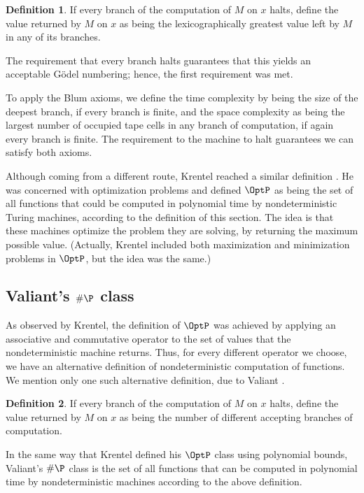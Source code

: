 \documentclass[12pt]{article}
\theoremstyle{definition}
\newtheorem{definition}{Definition}
\begin{document}
\begin{definition}
    If every branch of the computation of $M$ on $x$ halts,
    define the value returned by $M$ on $x$
    as being the lexicographically greatest value
    left by $M$ in any of its branches.
\end{definition}

The requirement that every branch halts
guarantees that this yields an acceptable Gödel numbering;
hence, the first requirement was met.

To apply the Blum axioms,
we define the time complexity by being the size of the deepest branch,
if every branch is finite,
and the space complexity as being the largest number of occupied tape cells
in any branch of computation,
if again every branch is finite.
The requirement to the machine to halt
guarantees we can satisfy both axioms.

Although coming from a different route,
Krentel reached a similar definition \cite{Krentel1988}.
He was concerned with optimization problems
and defined $\OptP$ as being the set of all functions
that could be computed in polynomial time
by nondeterministic Turing machines,
according to the definition of this section.
The idea is that these machines optimize the problem they are solving,
by returning the maximum possible value.
(Actually, Krentel included both maximization and minimization problems
in $\OptP$, but the idea was the same.)

\subsection{Valiant's $\#\P$ class}

As observed by Krentel,
the definition of $\OptP$ was achieved by applying
an associative and commutative operator to the set of values
that the nondeterministic machine returns.
Thus,
for every different operator we choose,
we have an alternative definition of nondeterministic computation of functions.
We mention only one such alternative definition,
due to Valiant \cite{Valiant1979}.

\begin{definition}
    If every branch of the computation of $M$ on $x$ halts,
    define the value returned by $M$ on $x$
    as being the number of different accepting branches of computation.
\end{definition}

In the same way that Krentel defined his $\OptP$ class using polynomial bounds,
Valiant's $\#\P$ class is the set of all functions
that can be computed in polynomial time by nondeterministic machines
according to the above definition.



\end{document}
